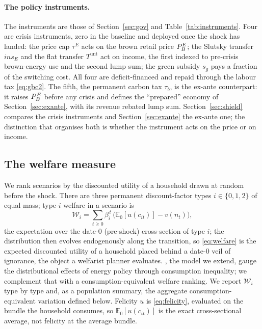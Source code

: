 \paragraph{The policy instruments.}\label{sec:instruments}

The instruments are those of Section~\ref{sec:gov} and Table~\ref{tab:instruments}.
Four are crisis instruments, zero in the baseline and deployed once the shock has
landed: the price cap $\tau^E$ acts on the brown retail price $P^{E}_{B}$; the Slutsky
transfer $ins_E$ and the flat transfer $T^{\mathrm{unt}}$ act on income, the first
indexed to pre-crisis brown-energy use and the second lump sum; the green subsidy
$s_g$ pays a fraction of the switching cost. All four are deficit-financed and
repaid through the labour tax \eqref{eq:gbc2}. The fifth, the permanent carbon tax
$\tau_b$, is the ex-ante counterpart: it raises $P^{E}_{B}$ before any crisis and defines
the ``prepared'' economy of Section~\ref{sec:exante}, with its revenue rebated lump
sum. Section~\ref{sec:shield} compares the crisis instruments and
Section~\ref{sec:exante} the ex-ante one; the distinction that organises both is
whether the instrument acts on the price or on income.

\subsection{The welfare measure}
\label{sec:welfare}

We rank scenarios by the discounted utility of a
household drawn at random before the shock. There are three permanent
discount-factor types $i\in\{0,1,2\}$ of equal mass; type-$i$ welfare in a scenario
is
%
\begin{equation}
  \mathcal{W}_i=\sum_{t\ge0}\beta_i^{\,t}\,\bigl(\mathbb{E}_0[u(c_{it})]-v(n_t)\bigr),
  \label{eq:welfare}
\end{equation}
%
the expectation over the date-$0$ (pre-shock) cross-section of type $i$; the
distribution then evolves endogenously along the transition, so \eqref{eq:welfare}
is the expected discounted utility of a household placed behind a date-$0$ veil of
ignorance, the object a welfarist planner evaluates.
\citet{auclert2023energy}, the model we extend, gauge the distributional effects of energy
policy through consumption inequality; we complement that with a
consumption-equivalent welfare ranking. We report $\mathcal{W}_i$ type by type and,
as a population summary, the aggregate consumption-equivalent variation defined below. Felicity $u$
is \eqref{eq:felicity}, evaluated on the bundle the household consumes, so
$\mathbb{E}_0[u(c_{it})]$ is the exact cross-sectional average, not felicity at the
average bundle.

